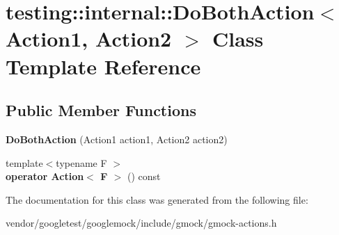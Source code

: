 \hypertarget{classtesting_1_1internal_1_1DoBothAction}{}\section{testing\+:\+:internal\+:\+:Do\+Both\+Action$<$ Action1, Action2 $>$ Class Template Reference}
\label{classtesting_1_1internal_1_1DoBothAction}
\subsection*{Public Member Functions}
\begin{DoxyCompactItemize}
\item 
{\bfseries Do\+Both\+Action} (Action1 action1, Action2 action2)\hypertarget{classtesting_1_1internal_1_1DoBothAction_a55727c4dbdc1816ba6f1fe124e96088b}{}\label{classtesting_1_1internal_1_1DoBothAction_a55727c4dbdc1816ba6f1fe124e96088b}

\item 
{\footnotesize template$<$typename F $>$ }\\{\bfseries operator Action$<$ F $>$} () const \hypertarget{classtesting_1_1internal_1_1DoBothAction_a5e416375c3d61b268d27cf594c135344}{}\label{classtesting_1_1internal_1_1DoBothAction_a5e416375c3d61b268d27cf594c135344}

\end{DoxyCompactItemize}


The documentation for this class was generated from the following file\+:\begin{DoxyCompactItemize}
\item 
vendor/googletest/googlemock/include/gmock/gmock-\/actions.\+h\end{DoxyCompactItemize}
